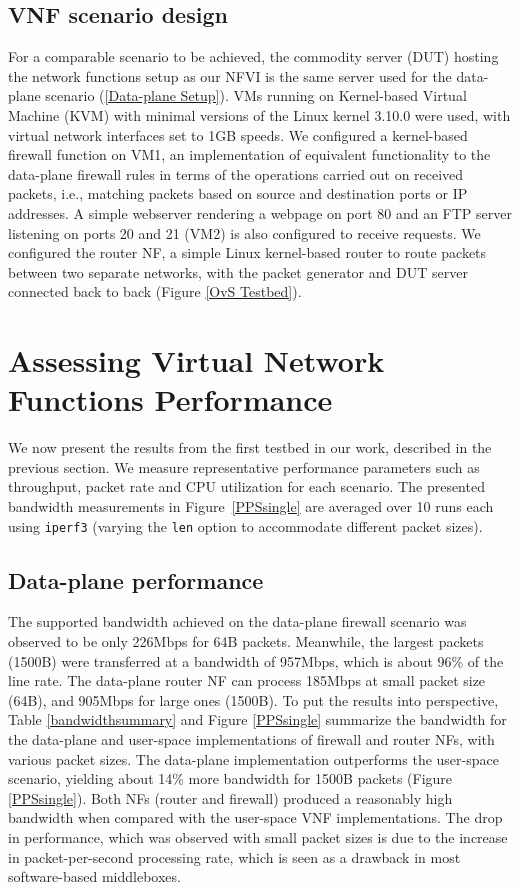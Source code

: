 \documentclass[conference]{IEEEtran}
\begin{document}
\subsection{VNF scenario design}
\label{VNF-setup-section}
 For a comparable scenario to be achieved, the commodity server (DUT) hosting the network functions setup as our NFVI is the same server used for the data-plane scenario (\cref{Data-plane Setup}). VMs running on Kernel-based Virtual Machine (KVM) with minimal versions of the Linux kernel 3.10.0 were used, with virtual network interfaces set to 1GB speeds. We configured a kernel-based firewall function on VM1, an implementation of equivalent functionality to the data-plane firewall rules in terms of the operations carried out on received packets, i.e., matching packets based on source and destination ports or IP addresses. A simple webserver rendering a webpage on port 80 and an FTP server listening on ports 20 and 21 (VM2) is also configured to receive requests. We configured the router NF, a simple Linux kernel-based router to route packets between two separate networks, with the packet generator and DUT server connected back to back (Figure \ref{OvS Testbed}).

\section{Assessing Virtual Network Functions Performance}
\label{evaluations}
We now present the results from the first testbed in our work, described in the previous section.
We measure representative performance parameters such as throughput, packet rate and CPU utilization for each scenario. The presented bandwidth measurements in Figure~\ref{PPSsingle} are averaged over 10 runs each using \texttt{iperf3} (varying the \texttt{len} option to accommodate different packet sizes). 


\subsection{Data-plane performance}
The supported bandwidth achieved on the data-plane firewall scenario was observed to be only 226Mbps for 64B packets. Meanwhile, the largest packets (1500B) were transferred at a bandwidth of 957Mbps, which is about 96\% of the line rate. The data-plane router NF can process 185Mbps at small packet size (64B), and 905Mbps for large ones (1500B). To put the results into perspective, 
Table \ref{bandwidthsummary} and Figure \ref{PPSsingle} summarize the bandwidth for the data-plane and user-space implementations of firewall and router NFs, with various packet sizes. 
The data-plane implementation outperforms the user-space scenario, yielding about 14\% more bandwidth for 1500B packets (Figure \ref{PPSsingle}). 
Both NFs (router and firewall) produced a reasonably high bandwidth when compared with the user-space VNF implementations. 
The drop in performance, which was observed with small packet sizes is due to the increase in packet-per-second processing rate, which is seen as a drawback in most software-based middleboxes.
\end{document}
